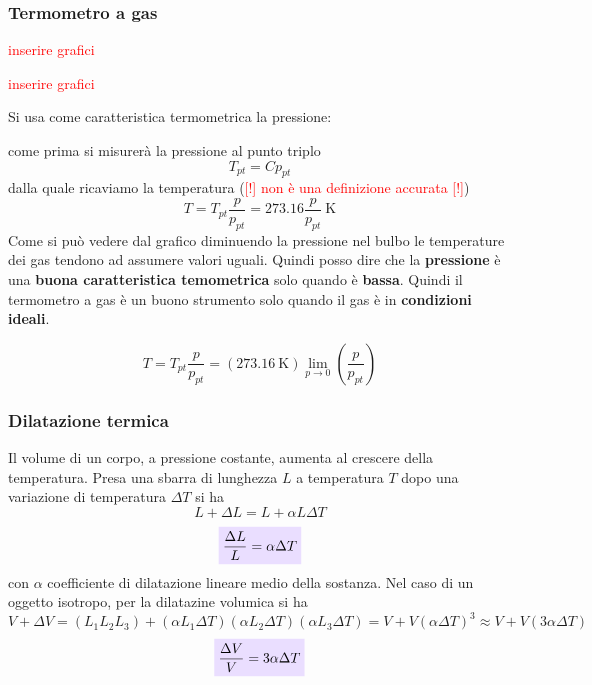 \documentclass[x11names]{article}
\newcommand{\viola}[1]{\colorbox{myred}{$\displaystyle #1$}}
\begin{document}
	\subsubsection{Termometro a gas}
	\begin{center}
		\begin{minipage}{0.49\textwidth}
			\begin{center}
				\textcolor{red}{inserire grafici}
			\end{center}
		\end{minipage}
		\begin{minipage}{0.49\textwidth}
			\begin{center}
				\textcolor{red}{inserire grafici}
			\end{center}
		\end{minipage}
	\end{center}
	Si usa come caratteristica termometrica la pressione:
	
	come prima si misurerà la pressione al punto triplo
	\[ 
	T_{pt} = Cp_{pt}
	\]
	dalla quale ricaviamo la temperatura (\textcolor{red}{[!] non è una definizione accurata [!]})
	\[ 
	T = T_{pt}\frac{p}{p_{pt}} = 273.16\frac{p}{p_{pt}}\SI{}{\kelvin}
	\]
	Come si può vedere dal grafico diminuendo la pressione nel bulbo le temperature dei gas tendono ad assumere valori uguali. Quindi posso dire che la \textbf{pressione} è una \textbf{buona caratteristica temometrica} solo quando è \textbf{bassa}. Quindi il termometro a gas è un buono strumento solo quando il gas è in \textbf{condizioni ideali}.
	
	\[ 
	T = T_{pt}\frac{p}{p_{pt}} = \left(\SI{273.16}{\kelvin}\right)\lim_{p\to 0}\left(\frac{p}{p_{pt}}\right)
	\]
	
	\subsubsection{Dilatazione termica}
	Il volume di un corpo, a pressione costante, aumenta al crescere della temperatura. Presa una sbarra di lunghezza \(L\) a temperatura \(T\) dopo una variazione di temperatura \(\Delta T\) si ha
	\[ 
	L +\Delta L = L + \alpha L\Delta T
	\]
	\[ 
	\viola{\frac{\Delta L}{L} = \alpha \Delta T}
	\]
	con \(\alpha\) coefficiente di dilatazione lineare medio della sostanza. Nel caso di un oggetto isotropo, per la dilatazine volumica si ha
	\[ 
	V + \Delta V = \left(L_1L_2L_3\right) + \left(\alpha L_1 \Delta T\right)\left(\alpha L_2 \Delta T\right)\left(\alpha L_3 \Delta T\right) = V + V(\alpha \Delta T)^3 \approx V + V(3\alpha \Delta T)
	\]
	\[ 
	\viola{\frac{\Delta V}{V} = 3\alpha \Delta T}
	\]
	
\end{document}
